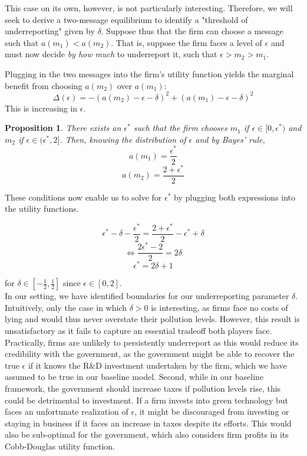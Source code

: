 \documentclass{article}
\newtheorem{proposition}{Proposition}
\begin{document}
This case on its own, however, is not particularly interesting. Therefore, we will seek to derive a two-message equilibrium to identify a "threshold of underreporting" given by $\delta$. Suppose thus that the firm can choose a message such that $a(m_1) < a(m_2)$. That is, suppose the firm faces a level of $\epsilon$ and must now decide \textit{by how much} to underreport it, such that $\epsilon > m_2 > m_1$.

Plugging in the two messages into the firm's utility function yields the marginal benefit from choosing $a(m_2)$ over $a(m_1)$:
\begin{equation}
    \Delta(\epsilon) = - (a(m_2) - \epsilon - \delta)^2 + (a(m_1) - \epsilon - \delta)^2
\end{equation}
This is increasing in $\epsilon$.

\begin{proposition}
    There exists an $\epsilon^*$ such that the firm chooses $m_1$ if $\epsilon \in [0, \epsilon^*)$ and $m_2$ if $\epsilon \in (\epsilon^*, 2]$. Then, knowing the distribution of $\epsilon$ and by Bayes' rule,
    \begin{equation*}
        a(m_1) = \frac{\epsilon^*}{2}
    \end{equation*}
    \begin{equation*}
        a(m_2) = \frac{2 + \epsilon^*}{2}
    \end{equation*}
\end{proposition}
\vspace{5mm}
These conditions now enable us to solve for $\epsilon^*$ by plugging both expressions into the utility functions.

$$\epsilon^* - \delta - \frac{\epsilon^*}{2} = \frac{2 + \epsilon^*}{2} - \epsilon^* + \delta$$
$$\Leftrightarrow\frac{2\epsilon^* - 2}{2} = 2\delta $$
\begin{equation}
    \epsilon^* = 2\delta + 1
\end{equation}

for $\delta \in [- \frac{1}{2}, \frac{1}{2}]$ since $\epsilon \in [0,2]$. \\

In our setting, we have identified boundaries for our underreporting parameter $\delta$. Intuitively, only the case in which $\delta > 0$ is interesting, as firms face no costs of lying and would thus never overstate their pollution levels. However, this result is unsatisfactory as it fails to capture an essential tradeoff both players face. Practically, firms are unlikely to persistently underreport as this would reduce its credibility with the government, as the government might be able to recover the true $\epsilon$ if it knows the R\&D investment undertaken by the firm, which we have assumed to be true in our baseline model. Second, while in our baseline framework, the government should increase taxes if pollution levels rise, this could be detrimental to investment. If a firm invests into green technology but faces an unfortunate realization of $\epsilon$, it might be discouraged from investing or staying in business if it faces an increase in taxes despite its efforts. This would also be sub-optimal for the government, which also considers firm profits in its Cobb-Douglas utility function.
\end{document}
